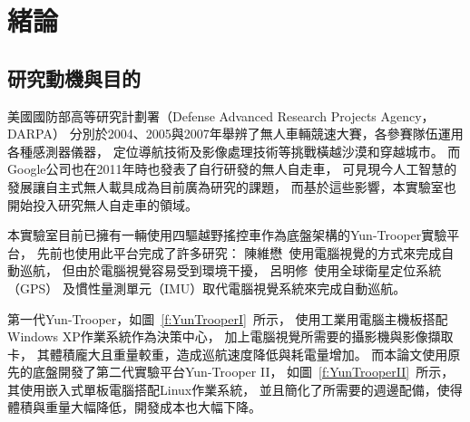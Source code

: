 \chapter{緒論}
\label{c:intro}
\section{研究動機與目的}
美國國防部高等研究計劃署（Defense Advanced Research Projects Agency，DARPA）
分別於2004、2005與2007年舉辨了無人車輛競速大賽，各參賽隊伍運用各種感測器儀器，
定位導航技術及影像處理技術等挑戰橫越沙漠和穿越城市。
而Google公司也在2011年時也發表了自行研發的無人自走車，
可見現今人工智慧的發展讓自主式無人載具成為目前廣為研究的課題，
而基於這些影響，本實驗室也開始投入研究無人自走車的領域。

本實驗室目前已擁有一輛使用四驅越野搖控車作為底盤架構的Yun-Trooper實驗平台，
先前也使用此平台完成了許多研究：
陳維懋~\cite{Chen:2011:Thesis}使用電腦視覺的方式來完成自動巡航，
但由於電腦視覺容易受到環境干擾，
呂明修~\cite{Liu:2012:Thesis}使用全球衛星定位系統（GPS）
及慣性量測單元（IMU）取代電腦視覺系統來完成自動巡航。

第一代Yun-Trooper，如圖~\ref{f:YunTrooperI}~所示，
使用工業用電腦主機板搭配Windows XP作業系統作為決策中心，
加上電腦視覺所需要的攝影機與影像擷取卡，
其體積龐大且重量較重，造成巡航速度降低與耗電量增加。
而本論文使用原先的底盤開發了第二代實驗平台Yun-Trooper II，
如圖~\ref{f:YunTrooperII}~所示，其使用嵌入式單板電腦搭配Linux作業系統，
並且簡化了所需要的週邊配備，使得體積與重量大幅降低，開發成本也大幅下降。

